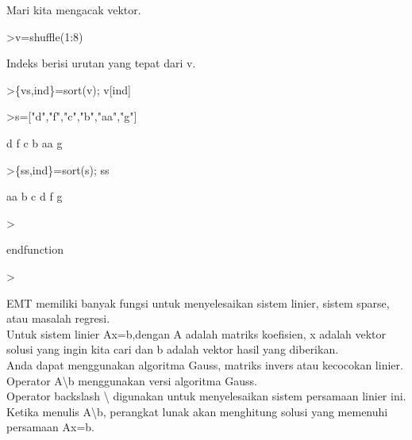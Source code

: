 \documentclass[a4paper,10pt]{article}
\begin{document}
\begin{eulernotebook}
\begin{eulercomment}
\begin{eulercomment}
\begin{eulercomment}
\begin{eulercomment}
\begin{eulercomment}
Mari kita mengacak vektor.
\end{eulercomment}
\begin{eulerprompt}
>v=shuffle(1:8) 
\end{eulerprompt}
\begin{euleroutput}
  [5,  4,  6,  1,  8,  2,  7,  3]
\end{euleroutput}
\begin{eulercomment}
Indeks berisi urutan yang tepat dari v.
\end{eulercomment}
\begin{eulerprompt}
>\{vs,ind\}=sort(v); v[ind]
\end{eulerprompt}
\begin{euleroutput}
  [1,  2,  3,  4,  5,  6,  7,  8]
\end{euleroutput}
\begin{eulerprompt}
>s=["d","f","c","b","aa","g"]
\end{eulerprompt}
\begin{euleroutput}
  d
  f
  c
  b
  aa
  g
\end{euleroutput}
\begin{eulerprompt}
>\{ss,ind\}=sort(s); ss
\end{eulerprompt}
\begin{euleroutput}
  aa
  b
  c
  d
  f
  g
\end{euleroutput}
\begin{eulerprompt}
>  
\end{eulerprompt}
\begin{eulerudf}
  endfunction
\end{eulerudf}
\begin{eulerprompt}
> 
\end{eulerprompt}
\begin{eulercomment}
EMT memiliki banyak fungsi untuk menyelesaikan sistem linier, sistem
sparse, atau masalah regresi.\\
Untuk sistem linier Ax=b,dengan A adalah matriks koefisien, x adalah
vektor solusi yang ingin kita cari dan b adalah vektor hasil yang
diberikan.\\
Anda dapat menggunakan algoritma Gauss, matriks invers atau kecocokan
linier.\\
Operator A\textbackslash{}b menggunakan versi algoritma Gauss.\\
Operator backslash \textbackslash{} digunakan untuk menyelesaikan sistem persamaan
linier ini. Ketika menulis A\textbackslash{}b, perangkat lunak akan menghitung solusi
yang memenuhi persamaan Ax=b.\\

\end{eulercomment}
\end{eulercomment}
\end{eulercomment}
\end{eulercomment}
\end{eulercomment}
\end{eulernotebook}
\end{document}
